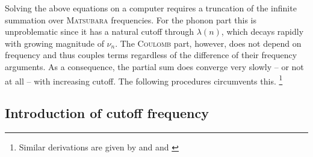 Solving the above equations on a computer requires a truncation of the infinite
summation over \textsc{Matsubara} frequencies. For the phonon part this is
unproblematic since it has a natural cutoff through $\lambda(n)$, which decays
rapidly with growing magnitude of $\nu_n$. The \textsc{Coulomb} part, however,
does not depend on frequency and thus couples terms regardless of the difference
of their frequency arguments. As a consequence, the partial sum does converge
very slowly -- or not at all -- with increasing cutoff. The following procedures
circumvents this.%
%
\footnote{Similar derivations are given by 
\cite[185-188]{Schrieffer83} and  and 
\cite[Section~9]{AllenMitrovic82}}

\subsection{Introduction of cutoff frequency}
\label{introduction of cutoff frequency}

